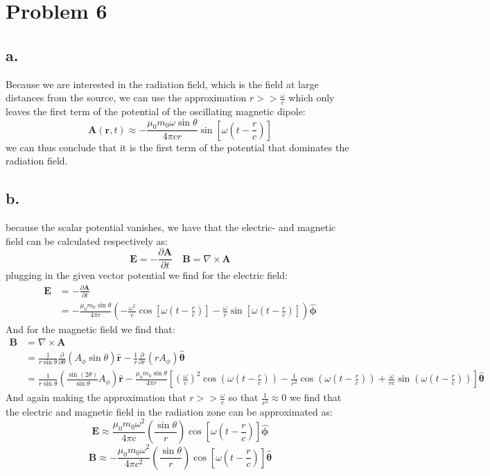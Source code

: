 \documentclass[11pt,a4paper]{article}
\begin{document}
\section*{Problem 6}
\subsection*{a.}
Because we are interested in the radiation field, which is the field at large distances from the source, we can use the approximation $r >> \frac{\omega}{c}$ which only leaves the first term of the potential of the oscillating magnetic dipole:
\[\mathbf{A}(\mathbf{r}, t) \approx -\frac{\mu_0m_0\omega\sin\theta}{4\pi c r}\sin[\omega(t-\frac{r}{c})]\]
we can thus conclude that it is the first term of the potential that dominates the radiation field.
\subsection*{b.}
because the scalar potential vanishes, we have that the electric- and magnetic field can be calculated respectively as:
\[\mathbf{E}=-\frac{\partial \mathbf{A}}{\partial t} \quad \mathbf{B}=\nabla\times\mathbf{A}\]
plugging in the given vector potential we find for the electric field:
\begin{align*}
\mathbf{E} &= -\frac{\partial \mathbf{A}}{\partial t}\\
&= -\frac{\mu_0 m_0 \sin\theta}{4\pi r}\left(-\frac{\omega^2}{c} \cos[\omega(t-\frac{r}{c})]-\frac{\omega}{r}\sin[\omega(t-\frac{r}{c})]\right)\hat{\mathbf{\phi}}
\end{align*}
And for the magnetic field we find that:
\begin{align*}
\mathbf{B} &= \nabla\times\mathbf{A}\\
&= \frac{1}{r\sin\theta}\frac{\partial}{\partial\theta}(A_{\phi}\sin\theta)\hat{\mathbf{r}}-\frac{1}{r}\frac{\partial}{\partial r}(rA_{\phi})\hat{\mathbf{\theta}}\\
&= \frac{1}{r\sin\theta}\left(\frac{\sin(2\theta)}{\sin\theta}A_{\phi}\right)\hat{\mathbf{r}}-\frac{\mu_0m_0\sin\theta}{4\pi r}\left[\left(\frac{\omega}{c}\right)^2\cos(\omega(t-\frac{r}{c}))-\frac{1}{r^2}\cos(\omega(t-\frac{r}{c}))+\frac{\omega}{rc}\sin(\omega(t-\frac{r}{c}))\right]\hat{\mathbf{\theta}}
\end{align*}
And again making the approximation that $r >> \frac{\omega}{c}$ so that $\frac{1}{r^2}\approx 0$ we find that the electric and magnetic field in the radiation zone can be approximated as:
\[\mathbf{E} \approx \frac{\mu_0 m_0 \omega^2}{4\pi c }\left(\frac{\sin\theta}{r}\right) \cos[\omega(t-\frac{r}{c})]\hat{\mathbf{\phi}}\]
\[ \mathbf{B} \approx -\frac{\mu_0 m_0 \omega^2}{4\pi c^2 }\left(\frac{\sin\theta}{r}\right) \cos[\omega(t-\frac{r}{c})]\hat{\mathbf{\theta}}\]   
\end{document}
